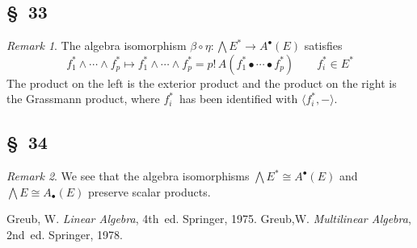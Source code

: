 \documentclass[letterpaper,12pt]{article}
\newcommand{\iso}{\cong}
\newcommand{\after}{\circ}
\newcommand{\eprod}{\wedge}
\newcommand{\bigeprod}{\bigwedge}
\newcommand{\medeprod}{{\textstyle\bigeprod}}
\newcommand{\fprod}{\bullet}
\newcommand{\adot}{\bullet}
\newcommand{\sprod}[2]{\langle#1,#2\rangle}
\newcommand{\multi}[4]{#2_{#3}#1\cdots#1#2_{#4}}
\newcommand{\eprods}[3]{\multi{\eprod}{#1}{#2}{#3}}
\newcommand{\fprods}[3]{\multi{\fprod}{#1}{#2}{#3}}
\theoremstyle{definition}
\theoremstyle{remark}
\newtheorem*{rmk}{Remark}
\begin{document}
\subsection*{\S~33}
\begin{rmk}
The algebra isomorphism \(\beta\after\eta:\medeprod E^*\to A^{\adot}(E)\) satisfies
\[\eprods{f^*}{1}{p}\mapsto\eprods{f^*}{1}{p}=p!\,A(\fprods{f^*}{1}{p})\qquad f^*_i\in E^*\]
The product on the left is the exterior product and the product on the right is the Grassmann product, where \(f^*_i\)~has been identified with \(\sprod{f^*_i}{-}\).
\end{rmk}

\subsection*{\S~34}
\begin{rmk}
We see that the algebra isomorphisms \(\medeprod E^*\iso A^{\adot}(E)\) and \(\medeprod E\iso A_{\adot}(E)\) preserve scalar products.
\end{rmk}

\newpage
\begin{thebibliography}{0}
 Greub, W. \textit{Linear Algebra}, 4th~ed. Springer, 1975.
 Greub,W. \textit{Multilinear Algebra}, 2nd~ed. Springer, 1978.
\end{thebibliography}
\end{document}
